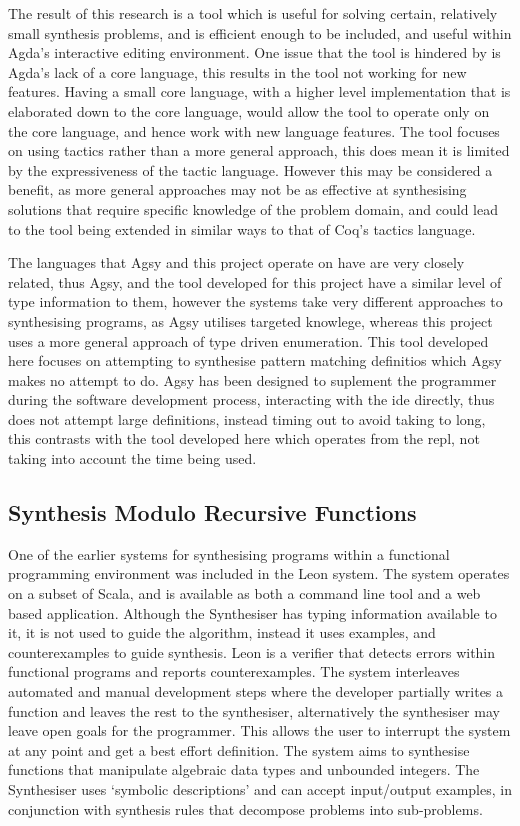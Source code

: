 \documentclass[a4paper]{article}
\begin{document}
The result of this research is a tool which is useful for solving 
certain, relatively small synthesis problems, and is efficient 
enough to be included, and useful within Agda's interactive editing
environment. One issue that the tool is hindered by is Agda's lack of 
a core language, this results in the tool not working for new features.
Having a small core language, with a higher level implementation that 
is elaborated down to the core language, would allow the tool to 
operate only on the core language, and hence work with new language 
features. The tool focuses on using tactics rather than a more general 
approach, this does mean it is limited by the expressiveness of the 
tactic language. However this may be considered a benefit, 
as more general approaches may not be as effective at synthesising 
solutions that require specific knowledge of the problem domain, and 
could lead to the tool being extended in similar ways to that of Coq's
tactics language. 

The languages that Agsy and this project operate on have are very
closely related, thus Agsy, and the tool developed for this project
have a similar level of type information to them, however the systems
take very different approaches to synthesising programs, as Agsy
utilises targeted knowlege, whereas this project uses a more general
approach of type driven enumeration. This tool developed here focuses
on attempting to synthesise pattern matching definitios which
Agsy makes no attempt to do. Agsy has been designed to suplement the
programmer during the software development process, interacting with
the ide directly, thus does not attempt large definitions, instead
timing out to avoid taking to long, this contrasts with the tool
developed here which operates from the repl, not taking into account
the time being used. 

\subsection{Synthesis Modulo Recursive Functions}
\label{sec:orge127ff1}
One of the earlier systems for synthesising programs within a functional
programming environment was included in the Leon system. The system 
operates on a subset of Scala, and is available as both a command line
tool and a web based application. Although the Synthesiser has typing 
information available to it, it is not used to guide the algorithm, 
instead it uses examples, and counterexamples to guide synthesis.
Leon is a verifier that detects errors within functional programs and 
reports counterexamples. The system interleaves automated and manual 
development steps where the developer partially writes a function and 
leaves the rest to the synthesiser, alternatively the synthesiser may 
leave open goals for the programmer. This allows the user to interrupt 
the system at any point and get a best effort definition. The system 
aims to synthesise functions that manipulate algebraic data types and 
unbounded integers. The Synthesiser uses `symbolic descriptions' and
can accept input/output examples, in conjunction with synthesis rules
that decompose problems into sub-problems. 
\end{document}
